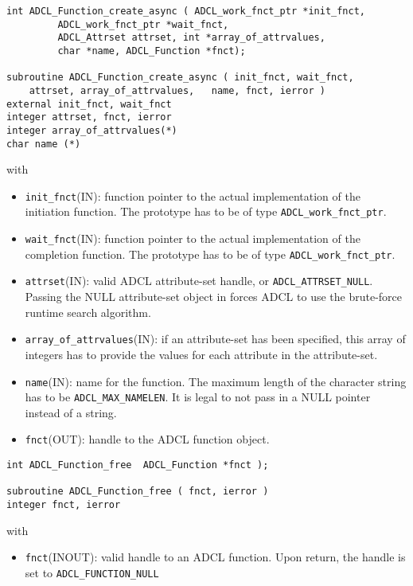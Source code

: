 \hspace{1cm}
\begin{verbatim}
int ADCL_Function_create_async ( ADCL_work_fnct_ptr *init_fnct, 
         ADCL_work_fnct_ptr *wait_fnct, 
         ADCL_Attrset attrset, int *array_of_attrvalues, 
         char *name, ADCL_Function *fnct);

subroutine ADCL_Function_create_async ( init_fnct, wait_fnct, 
    attrset, array_of_attrvalues, 	name, fnct, ierror )
external init_fnct, wait_fnct
integer attrset, fnct, ierror
integer array_of_attrvalues(*)
char name (*)	  
\end{verbatim}
with
\begin{itemize}
\item {\tt init\_fnct}(IN): function pointer to the actual implementation of the initiation function. The prototype has
     to be of type {\tt ADCL\_work\_fnct\_ptr}.
\item {\tt wait\_fnct}(IN): function pointer to the actual implementation of the completion function. The prototype has
     to be of type {\tt ADCL\_work\_fnct\_ptr}.
\item {\tt attrset}(IN): valid ADCL attribute-set handle, or {\tt ADCL\_ATTRSET\_NULL}. Passing the NULL attribute-set 
   object in forces ADCL to use the brute-force runtime search algorithm.
\item {\tt array\_of\_attrvalues}(IN): if an attribute-set has been specified, this array of
 integers has to provide the values for each attribute in the attribute-set. 
\item {\tt name}(IN): name for the function. The maximum length of the character string has to be 
  {\tt ADCL\_MAX\_NAMELEN}. It is legal to not pass in a NULL pointer instead of a string.
\item {\tt fnct}(OUT): handle to the ADCL function object.
\end{itemize}

\hspace{1cm}
\begin{verbatim}
int ADCL_Function_free  ADCL_Function *fnct );

subroutine ADCL_Function_free ( fnct, ierror )
integer fnct, ierror
\end{verbatim}
with
\begin{itemize}
\item {\tt fnct}(INOUT): valid handle to an ADCL function. Upon return, the handle is set to {\tt ADCL\_FUNCTION\_NULL}
\end{itemize}

